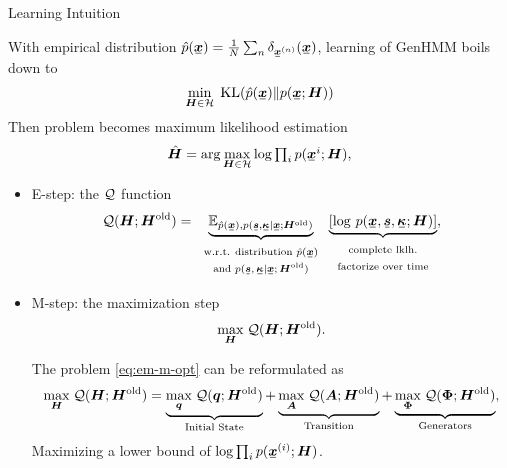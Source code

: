 \begin{frame}{Learning Intuition}
  
  With empirical distribution $\hat{p}(\ubm{x}) = \frac{1}{N}\sum_{n}\delta_{\ubm{x}^{(n)}}(\ubm{x})$, learning of GenHMM boils down to
  \begin{equation*}
    \min_{\bm{H}\in \Hh}\;\mathrm{KL}(\hat{p}(\ubm{x})\|p(\ubm{x};\bm{H}))
  \end{equation*}
  Then problem becomes maximum likelihood estimation \\
  \begin{equation*}
    \hat{\bm{H}} =    \arg \max_{\bm{H} \in \Hh} \log \textstyle\prod_{i} p(\ubm{x}^{i};\bm{H}),
  \end{equation*}

  \begin{itemize}
  \item E-step: 
    the $\mathcal{Q}$ function
    \begin{equation*}\label{eq:em-q-funciton}
      \Qq(\bm{H}; \bm{H}^{\mathrm{old}}) = \underbrace{\EE_{\hat{p}(\ubm{x}),p(\ubm{s},\ubm{\kappa}| \ubm{x}; \bm{H}^{\mathrm{old}})}}_{\text{\begin{tabular}{c}w.r.t. distribution $\hat{p}(\ubm{x})$ \\and $p(\ubm{s},\ubm{\kappa}| \ubm{x}; \bm{H}^{\mathrm{old}})$\end{tabular}}} \underbrace{\left[\log\,p(\ubm{x}, \ubm{s}, \ubm{\kappa}; \bm{H})\right]}_{\text{\begin{tabular}{c}complete lklh.\\ factorize over time\end{tabular}}},
    \end{equation*}
    
  \item M-step: the maximization step
    \begin{equation*}\label{eq:em-m-opt}
      \underset{\bm{H}}{\max}\; \mathcal{Q}(\bm{H}; \bm{H}^{\mathrm{old}}).
    \end{equation*}

    The problem \eqref{eq:em-m-opt} can be reformulated as
    \begin{align}\label{eq:m-step-subs}
      \underset{\bm{H}}{\max}\; \mathcal{Q}(\bm{H}; \bm{H}^{\mathrm{old}})
      =\underbrace{\underset{\bm{q}}{\max}\;\mathcal{Q}(\bm{q}; \bm{H}^{\mathrm{old}})}_\text{Initial State}
      + \underbrace{\underset{\bm{A}}{\max}\;\mathcal{Q}(\bm{A}; \bm{H}^{\mathrm{old}})}_\text{Transition} 
      + \underbrace{\underset{\bm{\Phi}}{\max}\;\mathcal{Q}(\bm{\Phi}; \bm{H}^{\mathrm{old}})}_\text{Generators},
    \end{align}
    Maximizing a lower bound of $\log \textstyle\prod_{i} p(\ubm{x}^{(i)};\bm{H})$.


\end{itemize}
\end{frame}
